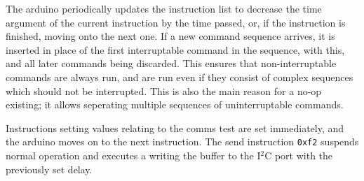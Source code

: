 The arduino periodically updates the instruction list to decrease the time
argument of the current instruction by the time passed, or, if the instruction
is finished, moving onto the next one. If a new command sequence arrives, it is
inserted in place of the first interruptable command in the sequence, with
this, and all later commands being discarded. This ensures that
non-interruptable commands are always run, and are run even if they consist of
complex sequences which should not be interrupted. This is also the main reason
for a no-op existing; it allows seperating multiple sequences of
uninterruptable commands.

Instructions setting values relating to the comms test are set immediately,
and the arduino moves on to the next instruction. The send instruction
\texttt{0xf2} suspends normal operation and executes a writing the buffer to
the I$^2$C port with the previously set delay.

